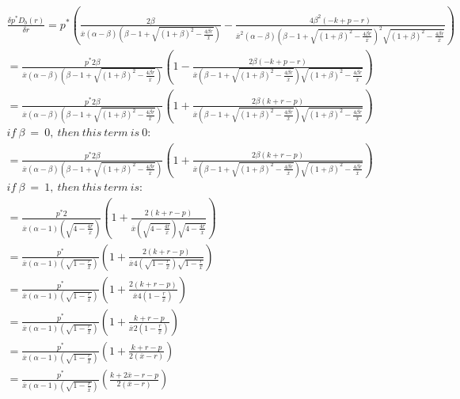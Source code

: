 \documentclass{article}
\begin{document}
\[
\begin{array}{ll}
\frac{\delta p^* D_b(r)}{\delta r} = 
p^* \left(\frac{2 \beta}{\overline{x} (\alpha-\beta) \left(\beta-1+\sqrt{(1+\beta)^2-\frac{4 \beta r}{\overline{x}}}\right)}
-\frac{4 \beta^2(-k+p-r)}{\overline{x}^2 (\alpha-\beta) \left(\beta-1+\sqrt{(1+\beta)^2-\frac{4 \beta r}{\overline{x}}}\right)^2   \sqrt{(1+\beta)^2-\frac{4\beta r}{\overline{x}}}} \right) \\
= \frac{p^*2 \beta}{\overline{x} (\alpha-\beta) \left(\beta-1+\sqrt{(1+\beta)^2-\frac{4 \beta r}{\overline{x}}}\right)} \left(1
-\frac{2 \beta(-k+p-r)}{\overline{x} \left(\beta-1+\sqrt{(1+\beta)^2-\frac{4 \beta r}{\overline{x}}}\right)   \sqrt{(1+\beta)^2-\frac{4\beta r}{\overline{x}}}} \right) \\
= \frac{p^*2 \beta}{\overline{x} (\alpha-\beta) \left(\beta-1+\sqrt{(1+\beta)^2-\frac{4 \beta r}{\overline{x}}}\right)} \left(1
+\frac{2 \beta(k+r-p)}{\overline{x} \left(\beta-1+\sqrt{(1+\beta)^2-\frac{4 \beta r}{\overline{x}}}\right)   \sqrt{(1+\beta)^2-\frac{4\beta r}{\overline{x}}}} \right) \\

if~\beta~=~0,~then ~this~ term~ is~ 0: \\
= \frac{p^*2 \beta}{\overline{x} (\alpha-\beta) \left(\beta-1+\sqrt{(1+\beta)^2-\frac{4 \beta r}{\overline{x}}}\right)} \left(1
+\frac{2 \beta(k+r-p)}{\overline{x} \left(\beta-1+\sqrt{(1+\beta)^2-\frac{4 \beta r}{\overline{x}}}\right)   \sqrt{(1+\beta)^2-\frac{4\beta r}{\overline{x}}}} \right) \\

if~\beta~=~1,~then ~this~ term~ is: \\
= \frac{p^*2 }{\overline{x} (\alpha-1) \left(\sqrt{4-\frac{4 r}{\overline{x}}}\right)} \left(1
+\frac{2 (k+r-p)}{\overline{x} \left(\sqrt{4-\frac{4 r}{\overline{x}}}\right)   \sqrt{4-\frac{4 r}{\overline{x}}}} \right) \\ 
= \frac{p^* }{\overline{x} (\alpha-1) \left(\sqrt{1-\frac{ r}{\overline{x}}}\right)} \left(1
+\frac{2 (k+r-p)}{\overline{x} 4 \left(\sqrt{1-\frac{ r}{\overline{x}}}\right)   \sqrt{1-\frac{ r}{\overline{x}}}} \right) \\ 
= \frac{p^* }{\overline{x} (\alpha-1) \left(\sqrt{1-\frac{ r}{\overline{x}}}\right)} \left(1
+\frac{2 (k+r-p)}{ \overline{x} 4 \left( 1-\frac{ r}{ \overline{x} } \right)} \right) \\
= \frac{p^* }{\overline{x} (\alpha-1) \left(\sqrt{1-\frac{ r}{\overline{x}}}\right)} \left(1
+\frac{k+r-p}{ \overline{x} 2 \left( 1-\frac{ r}{ \overline{x} } \right)} \right) \\
= \frac{p^* }{\overline{x} (\alpha-1) \left(\sqrt{1-\frac{ r}{\overline{x}}}\right)} \left(1
+\frac{k+r-p}{ 2(\overline{x} -r) } \right)    \\ 
= \frac{p^* }{\overline{x} (\alpha-1) \left(\sqrt{1-\frac{ r}{\overline{x}}}\right)} \left(\frac{k+ 2\overline{x} -r-p}{ 2(\overline{x} -r) } \right)    \\ 


\end{array}\]
\end{document}
